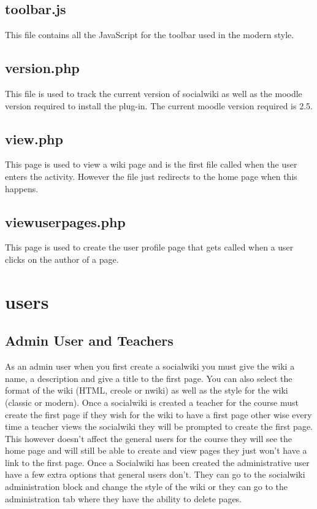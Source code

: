 \documentclass[letterpaper,twoside,12pt]{report}
\begin{document}
	\section{toolbar.js}
	This file contains all the JavaScript for the toolbar used in the modern style.
	\section{version.php}
	This file is used to track the current version of socialwiki as well as the moodle version required to install the plug-in. The current moodle version required is 2.5.
	\section{view.php}
	This page is used to view a wiki page and is the first file called when the user enters the activity. However the file just redirects to the home page when this happens.
	\section{viewuserpages.php}
	This page is used to create the user profile page that gets called when a user clicks on the author of a page.
	
	
	\chapter{users}
	\section{Admin User and Teachers}
	As an admin user when you first create a socialwiki you must give the wiki a name, a description and give a title to the first page. You can also select the format of the wiki (HTML, creole or nwiki) as well as the style for the wiki (classic or modern). Once a socialwiki is created a teacher for the course must create the first page if they wish for the wiki to have a first page other wise every time a teacher views the socialwiki they will be prompted to create the first page. This however doesn't affect the general users for the course they will see the home page and will still be able to create and view pages they just won't have a link to the first page. 
	Once a Socialwiki has been created the administrative user have a few extra options that general users don't. They can go to the socialwiki administration block and change the style of the wiki or they can go to the administration tab where they have the ability to delete pages.
\end{document}
